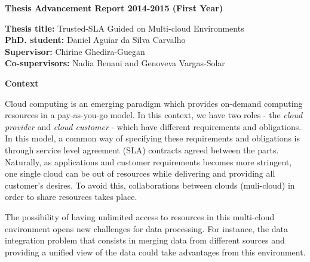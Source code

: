 \documentclass[12pt,a4paper,oneside]{report}
\author{Daniel Aguiar da Silva Carvalho}
\begin{document}
\begin{center}
\textbf{\large{Thesis Advancement Report 2014-2015 (First Year)}}
\end{center}

\begin{flushleft}
\textbf{Thesis title:} Trusted-SLA Guided on Multi-cloud Environments \\
\textbf{PhD. student:} Daniel Aguiar da Silva Carvalho \\
\textbf{Supervisor:} Chirine Ghedira-Guegan \\ 
\textbf{Co-supervisors:} Nadia Benani and Genoveva Vargas-Solar
\end{flushleft}

\begin{flushleft}
\textbf{Context}\\
\end{flushleft}

Cloud computing is an emerging paradigm which provides on-demand computing resources in a pay-as-you-go model. In this context, we have two roles - the \textit{cloud provider} and \textit{cloud customer} - which have different requirements and obligations. In this model, a common way of specifying these requirements and obligations is through service level agreement (SLA) contracts agreed between the parts. Naturally, as applications and customer requirements becomes more stringent, one single cloud can be out of resources while delivering and providing all customer's desires. To avoid this, collaborations between clouds (muli-cloud) in order to share resources takes place. 

The possibility of having unlimited access to resources in this multi-cloud environment opens new challenges for data processing. For instance, the data integration problem that consists in merging data from different sources and providing a unified view of the data could take advantages from this environment. 
\end{document}
